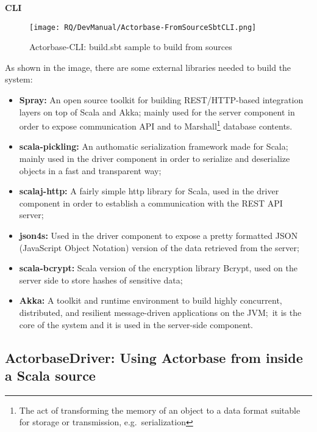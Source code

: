 \documentclass{scalatekids-article}
\begin{document}
\textbf{CLI}

 \begin{figure}[H]
   \begin{center}
     \texttt{[image: RQ/DevManual/Actorbase-FromSourceSbtCLI.png]}
     \caption{Actorbase-CLI: build.sbt sample to build from sources}
   \end{center}
 \end{figure}

As shown in the image, there are some external libraries needed to build the system:
\begin{itemize}
\item \textbf{Spray:} An open source toolkit for building REST/HTTP-based
  integration layers on top of Scala and Akka; mainly used for the server
  component in order to expose communication API and to
  Marshall\footnote{The act of transforming the memory of an object to a data format suitable
    for storage or transmission, e.g.\ serialization} database contents.
\item \textbf{scala-pickling:} An authomatic serialization framework made for
  Scala; mainly used in the driver component in order to serialize and
  deserialize objects in a fast and transparent way;
\item \textbf{scalaj-http:} A fairly simple http library for Scala, used in the
  driver component in order to establish a communication with the REST API server;\
\item \textbf{json4s:} Used in the driver component to expose a pretty formatted
  JSON (JavaScript Object Notation) version of the data retrieved from the server;
\item \textbf{scala-bcrypt:} Scala version of the encryption library Bcrypt,
  used on the server side to store hashes of sensitive data;
\item \textbf{Akka:} A toolkit and runtime environment to build highly concurrent,
  distributed, and resilient message-driven applications on the JVM;\ it is the core of
  the system and it is used in the server-side component.
\end{itemize}


\subsection{ActorbaseDriver: Using Actorbase from inside a Scala source}
\end{document}
